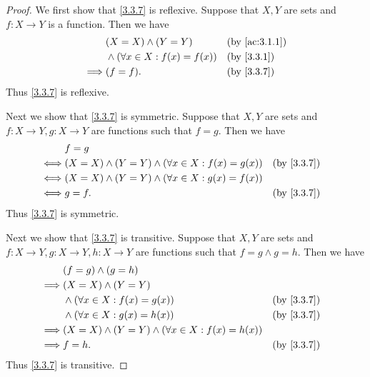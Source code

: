 \begin{proof}
  We first show that \cref{3.3.7} is reflexive.
  Suppose that \(X, Y\) are sets and \(f : X \to Y\) is a function.
  Then we have
  \begin{align*}
             & (X = X) \land (Y = Y)                 &  & \text{(by \cref{ac:3.1.1})} \\
             & \land (\forall x \in X : f(x) = f(x)) &  & \by{3.3.1}                  \\
    \implies & (f = f).                              &  & \by{3.3.7}
  \end{align*}
  Thus \cref{3.3.7} is reflexive.

  Next we show that \cref{3.3.7} is symmetric.
  Suppose that \(X, Y\) are sets and \(f : X \to Y, g : X \to Y\) are functions such that \(f = g\).
  Then we have
  \begin{align*}
         & f = g                                                                       \\
    \iff & (X = X) \land (Y = Y) \land (\forall x \in X : f(x) = g(x)) &  & \by{3.3.7} \\
    \iff & (X = X) \land (Y = Y) \land (\forall x \in X : g(x) = f(x))                 \\
    \iff & g = f.                                                      &  & \by{3.3.7}
  \end{align*}
  Thus \cref{3.3.7} is symmetric.

  Next we show that \cref{3.3.7} is transitive.
  Suppose that \(X, Y\) are sets and \(f : X \to Y, g : X \to Y, h : X \to Y\) are functions such that \(f = g \land g = h\).
  Then we have
  \begin{align*}
             & (f = g) \land (g = h)                                                       \\
    \implies & (X = X) \land (Y = Y)                                                       \\
             & \land (\forall x \in X : f(x) = g(x))                       &  & \by{3.3.7} \\
             & \land (\forall x \in X : g(x) = h(x))                       &  & \by{3.3.7} \\
    \implies & (X = X) \land (Y = Y) \land (\forall x \in X : f(x) = h(x))                 \\
    \implies & f = h.                                                      &  & \by{3.3.7}
  \end{align*}
  Thus \cref{3.3.7} is transitive.


\end{proof}
